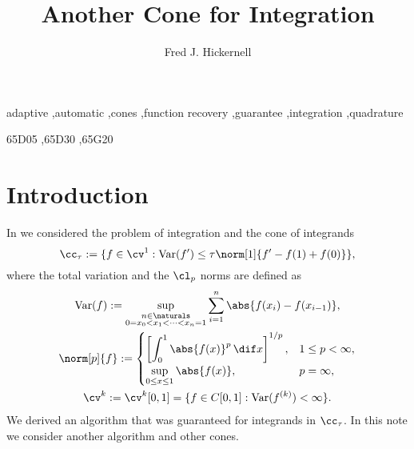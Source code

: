 \documentclass[]{elsarticle}
\DeclareMathOperator{\Var}{Var}
\theoremstyle{definition}
\theoremstyle{remark}
\begin{document}
\begin{frontmatter}

\title{Another Cone for Integration}
\author{Fred J. Hickernell} 
\address{Room E1-208, Department of Applied Mathematics, Illinois Institute of Technology,\\ 10 W.\ 32$^{\text{nd}}$ St., Chicago, IL 60616}

\begin{abstract} 

\end{abstract}

\begin{keyword}
adaptive \sep automatic \sep cones \sep function recovery \sep guarantee \sep integration \sep quadrature

\MSC[2010] 65D05 \sep 65D30 \sep 65G20

\end{keyword}
\end{frontmatter}

\section{Introduction}

In \cite{HicEtal14b} we considered the problem of integration and the cone of integrands
\begin{equation}\label{origcone}
\cc_{\tau}:=\{f\in \cv^{1}:\Var(f')\leq\tau\norm[1]{f'-f(1)+f(0)}\},
\end{equation}
where the total variation and the $\cl_p$ norms are defined as
\begin{gather*}
\Var(f) := \sup_{\substack{n \in \naturals\\ 0 = x_0 < x_1 < \cdots < x_{n} =1}} \sum_{i=1}^n \abs{f(x_i)-f(x_{i-1})}, \\
\norm[p]{f}:= \begin{cases} \displaystyle \left[\int_0^1 \abs{f(x)}^p \, \dif x \right]^{1/p}, & 1 \le p < \infty,\\[1ex]
\displaystyle  \sup_{0 \le x \le 1} \abs{f(x)}, & p=\infty,
\end{cases}
\\
\cv^{k}: =\cv^{k}[0,1]=\{f\in C[0,1]: \Var(f^{(k)}) < \infty \}.
\end{gather*}
We derived an algorithm \cite[Algorithm 4]{HicEtal14b} that was guaranteed for integrands in $\cc_{\tau}$.  In this note we consider another algorithm and other cones.  
\end{document}
